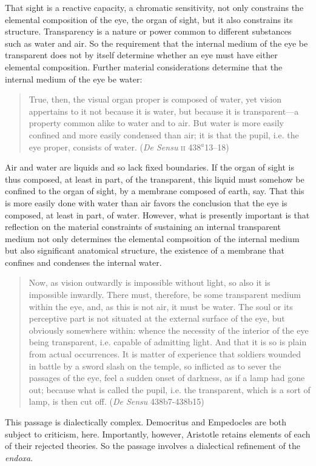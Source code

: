 That sight is a reactive capacity, a chromatic sensitivity, not only constrains the elemental composition of the eye, the organ of sight, but it also constrains its structure. Transparency is a nature or power common to different substances such as water and air. So the requirement that the internal medium of the eye be transparent does not by itself determine whether an eye must have either elemental composition. Further material considerations determine that the internal medium of the eye be water:
\begin{quote}
	True, then, the visual organ proper is composed of water, yet vision appertains to it not because it is water, but because it is transparent---a property common alike to water and to air. But water is more easily confined and more easily condensed than air; it is that the pupil, i.e. the eye proper, consists of water. (\emph{De Sensu} \textsc{ii} 438\( ^{a} \)13--18)
\end{quote}
Air and water are liquids and so lack fixed boundaries. If the organ of sight is thus composed, at least in part, of the transparent, this liquid must somehow be confined to the organ of sight, by a membrane composed of earth, say. That this is more easily done with water than air favors the conclusion that the eye is composed, at least in part, of water. However, what is presently important is that reflection on the material constraints of sustaining an internal transparent medium not only determines the elemental compsoition of the internal medium but also significant anatomical structure, the existence of a membrane that confines and condenses the internal water.



\begin{quote}
	Now, as vision outwardly is impossible without light, so also it is impossible inwardly. There must, therefore, be some transparent medium within the eye, and, as this is not air, it must be water. The soul or its perceptive part is not situated at the external surface of the eye, but obviously somewhere within: whence the necessity of the interior of the eye being transparent, i.e. capable of admitting light. And that it is so is plain from actual occurrences. It is matter of experience that soldiers wounded in battle by a sword slash on the temple, so inflicted as to sever the passages of the eye, feel a sudden onset of darkness, as if a lamp had gone out; because what is called the pupil, i.e. the transparent, which is a sort of lamp, is then cut off. (\emph{De Sensu} 438b7-438b15)
\end{quote}
This passage is dialectically complex. Democritus and Empedocles are both subject to criticism, here. Importantly, however, Aristotle retains elements of each of their rejected theories. So the passage involves a dialectical refinement of the \emph{endoxa}. 

